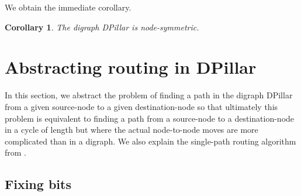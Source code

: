 \documentclass{article}
\newtheorem{corollary}[definition]{Corollary}
\begin{document}
We obtain the immediate corollary.

\begin{corollary}\label{lem:sym}
The digraph DPillar is node-symmetric.
\end{corollary}








\section{Abstracting routing in DPillar}\label{sec:routing}

In this section, we abstract the problem of finding a path in the digraph DPillar from a given source-node to a given destination-node so that ultimately this problem is equivalent to finding a path from a source-node to a destination-node in a cycle of length  but where the actual node-to-node moves are more complicated than in a digraph. We also explain the single-path routing algorithm from \cite{LYY12}.

\subsection{Fixing bits}
\end{document}
